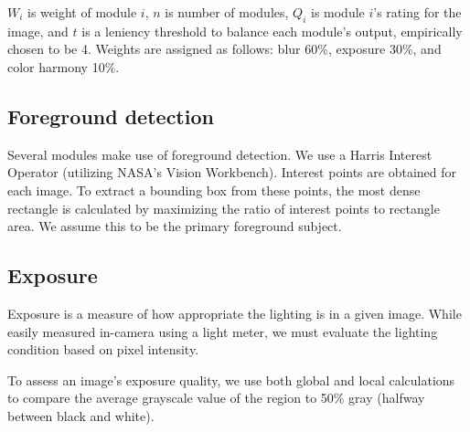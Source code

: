 \documentclass{article}
\begin{document}
\(W_i\) is weight of module \(i\), \(n\) is number of modules, \(Q_i\) is  module \(i\)'s rating for the image, and \(t\) is a leniency threshold to balance each module's output, empirically chosen to be 4. Weights are assigned as follows: blur 60\%, exposure 30\%, and color harmony 10\%.

\subsection{Foreground detection}\label{ContentRecognition}
Several modules make use of foreground detection. We use a Harris Interest Operator (utilizing NASA's Vision Workbench\cite{vision-workbench}). Interest points are obtained for each image. To extract a bounding box from these points, the most dense rectangle is calculated by maximizing the ratio of interest points to rectangle area. We assume this to be the primary foreground subject.


\subsection{Exposure}
Exposure is a measure of how appropriate the lighting is in a given image. While easily measured in-camera using a light meter, we must evaluate the lighting condition based on pixel intensity.%


To assess an image's exposure quality, we use both global and local calculations to compare the average grayscale value of the region to 50\% gray (halfway between black and white).
\end{document}

